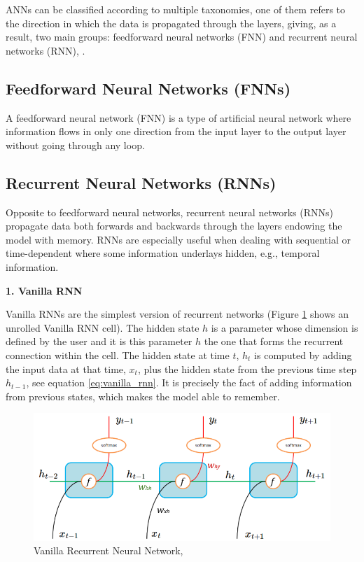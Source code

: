 

ANNs can be classified according to multiple taxonomies, one of them refers to the direction in which the data is propagated through the layers, giving, as a result, two main groups: feedforward neural networks (FNN) and recurrent neural networks (RNN), \cite{Classification-Artificial-Neural-Networks:2017}.

\subsection{Feedforward Neural Networks (FNNs)}

A feedforward neural network (FNN) is a type of artificial neural network where information flows in only one direction from the input layer to the output layer without going through any loop.
  \vspace{1mm} \\


\subsection{Recurrent Neural Networks (RNNs)}

Opposite to feedforward neural networks, recurrent neural networks (RNNs) propagate data both forwards and backwards through the layers endowing the model with memory. RNNs are especially useful when dealing with sequential or time-dependent where some information underlays hidden, e.g., temporal information.

\vspace{5mm} 
\textbf{1. Vanilla RNN}

Vanilla RNNs are the simplest version of recurrent networks (Figure \ref{fig:rnn} shows an unrolled Vanilla RNN cell). The hidden state $h$ is a parameter whose dimension is defined by the user and it is this parameter $h$ the one that forms the recurrent connection within the cell. The hidden state at time $t$, $h_t$ is computed by adding the input data at that time, $x_t$, plus the hidden state from the previous time step $h_{t-1}$, see equation \ref{eq:vanilla_rnn}. It is precisely the fact of adding information from previous states, which makes the model able to remember.

%

\begin{figure}[H]
    \centering
    \includegraphics[width=.7\textwidth]{Figures/rnn.png}
    \caption{Vanilla Recurrent Neural Network, \cite{Vanilla-RNN-image}}
    \label{fig:rnn}
\end{figure}



